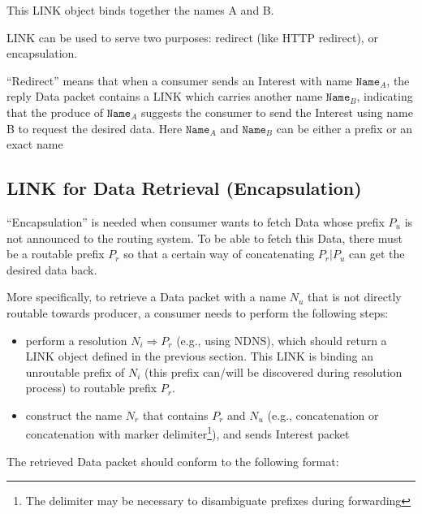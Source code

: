 \documentclass[10pt]{article}
\begin{document}
This LINK object binds together the names A and B.

LINK can be used to serve two purposes: redirect (like HTTP redirect), or encapsulation.

``Redirect'' means that when a consumer sends an Interest with name $\mathtt{Name}_A$, the reply Data packet contains a LINK which carries another name $\mathtt{Name}_B$, indicating that the produce of $\mathtt{Name}_A$ suggests the consumer to send the Interest using name B to request the desired data.
Here $\mathtt{Name}_A$ and $\mathtt{Name}_B$ can be either a prefix or an exact name

\subsection{LINK for Data Retrieval (Encapsulation)}

``Encapsulation'' is needed when consumer wants to fetch Data whose prefix $P_u$ is not announced to the routing system.
To be able to fetch this Data, there must be a routable prefix $P_r$ so that a certain way of concatenating $P_r|P_u$ can get the desired data back.

More specifically, to retrieve a Data packet with a name $N_{u}$ that is not directly routable towards producer, a consumer needs to perform the following steps:

\begin{itemize}
\item perform a resolution $N_i \Rightarrow P_r$ (e.g., using NDNS), which should return a LINK object defined in the previous section.
  This LINK is binding an unroutable prefix of $N_i$ (this prefix can/will be discovered during resolution process) to routable prefix $P_r$.
\item construct the name $N_{r}$ that contains $P_r$ and $N_{u}$ (e.g., concatenation or concatenation with marker delimiter\footnote{The delimiter may be necessary to disambiguate prefixes during forwarding}), and sends Interest packet
\end{itemize}

The retrieved Data packet should conform to the following format:
\end{document}
